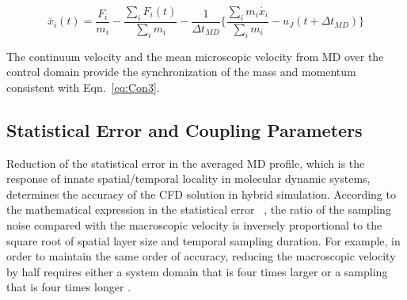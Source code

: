 \documentclass[preprint,12pt]{elsarticle}
\begin{document}
\vspace{-.2em}
\begin{equation}
 \ddot{x_{i}}(t) = \frac{F_{i}}{m_{i}} -  \frac{\displaystyle\sum_{i}F_{i}(t)} {\displaystyle\sum_{i}m_{i}} - \frac{1}{\Delta t_{MD}} \{  \frac{\displaystyle\sum_{i}m_{i}\dot{x_{i}}} {\displaystyle\sum_{i}m_{i}} - u_{J}(t + \Delta t_{MD})\}
 \label{eq:Con3}
\end{equation}
\normalsize

The continuum velocity and the mean microscopic velocity from MD over the control domain provide the synchronization of the mass and momentum consistent with Eqn.~\ref{eq:Con3}.


\subsection{Statistical Error and Coupling Parameters}
\label{sec:numerical_noise}



Reduction of the statistical error in the averaged MD profile, which is the response of innate spatial/temporal locality in molecular dynamic systems, determines the accuracy of the CFD solution in hybrid simulation. According to the mathematical expression in the statistical error ~\cite{Hadjicon3,Time_Mechanism}, the ratio of the sampling noise compared with the macroscopic velocity is inversely proportional to the square root of spatial layer size and temporal sampling duration. For example, in order to maintain the same order of accuracy, reducing the macroscopic velocity by half requires either a system domain that is four times larger or a sampling that is four times longer .
\end{document}
